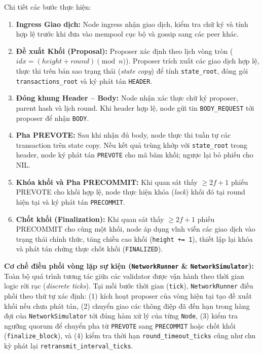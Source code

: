 \documentclass[10pt,a4paper]{report}
\begin{document}
Chi tiết các bước thực hiện:
\begin{enumerate}
  \item \textbf{Ingress Giao dịch:} Node ingress nhận giao dịch, kiểm tra chữ ký và tính hợp lệ trước khi đưa vào mempool cục bộ và gossip sang các peer khác.
  \item \textbf{Đề xuất Khối (Proposal):} Proposer xác định theo lịch vòng tròn ($idx = (height + round) \pmod n$). Proposer trích xuất các giao dịch hợp lệ, thực thi trên bản sao trạng thái (\emph{state copy}) để tính \texttt{state\_root}, đóng gói \texttt{transactions\_root} và ký phát tán \texttt{HEADER}.
  \item \textbf{Đóng khung Header -- Body:} Node nhận xác thực chữ ký proposer, parent hash và lịch round. Khi header hợp lệ, node gửi tin \texttt{BODY\_REQUEST} tới proposer để nhận \texttt{BODY}.
  \item \textbf{Pha PREVOTE:} Sau khi nhận đủ body, node thực thi tuần tự các transaction trên state copy. Nếu kết quả trùng khớp với \texttt{state\_root} trong header, node ký phát tán \texttt{PREVOTE} cho mã băm khối; ngược lại bỏ phiếu cho NIL.
  \item \textbf{Khóa khối và Pha PRECOMMIT:} Khi quan sát thấy $\ge 2f + 1$ phiếu PREVOTE cho khối hợp lệ, node thực hiện khóa (\emph{lock}) khối đó tại round hiện tại và ký phát tán \texttt{PRECOMMIT}.
  \item \textbf{Chốt khối (Finalization):} Khi quan sát thấy $\ge 2f + 1$ phiếu PRECOMMIT cho cùng một khối, node áp dụng vĩnh viễn các giao dịch vào trạng thái chính thức, tăng chiều cao khối (\texttt{height += 1}), thiết lập lại khóa và phát tán chứng thực chốt khối (\texttt{FINALIZED}).
\end{enumerate}
\medskip\noindent\textbf{Cơ chế điều phối vòng lặp sự kiện (\texttt{NetworkRunner} \& \texttt{NetworkSimulator}):}
Toàn bộ quá trình tương tác giữa các validator được vận hành theo thời gian logic rời rạc (\emph{discrete ticks}). Tại mỗi bước thời gian (\texttt{tick}), \texttt{NetworkRunner} điều phối theo thứ tự xác định: (1) kích hoạt proposer của vòng hiện tại tạo đề xuất khối nếu chưa phát tán, (2) chuyển giao các thông điệp đã đến hạn trong hàng đợi của \texttt{NetworkSimulator} tới đúng hàm xử lý của từng \texttt{Node}, (3) kiểm tra ngưỡng quorum để chuyển pha từ \texttt{PREVOTE} sang \texttt{PRECOMMIT} hoặc chốt khối (\texttt{finalize\_block}), và (4) kiểm tra thời hạn \texttt{round\_timeout\_ticks} cũng như chu kỳ phát lại \texttt{retransmit\_interval\_ticks}.
\end{document}
